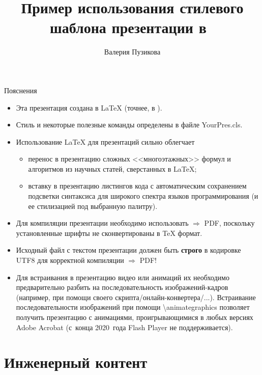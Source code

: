 \documentclass{YourPres}
\title{Пример использования стилевого шаблона презентации в~\XeLaTeX}
\author{Валерия Пузикова}
\begin{document}
  \Yourtitlepage

  \begin{frame}{Пояснения}
    \begin{itemize}
      \item[\YourCheckedbox] Эта презентация создана в \LaTeX{} (точнее, в \XeLaTeX{}).\\
      \item[\YourCheckedbox] Стиль и некоторые полезные команды определены в файле YourPres.cls.\\
      \item[\YourCrossedbox] Использование \LaTeX{} для презентаций сильно облегчает
         \begin{itemize}
            \item перенос в презентацию сложных <<многоэтажных>> формул и алгоритмов из научных статей, сверстанных в \LaTeX{}; \\
            \item вставку в презентацию листингов кода с автоматическим сохранением подсветки синтаксиса для широкого спектра языков программирования (и ее стилизацией под выбранную палитру).\\
         \end{itemize}
      \item[\YourHandRight] Для компиляции презентации необходимо использовать \XeLaTeX{} $\Rightarrow$ PDF, поскольку установленные шрифты не сконвертированы в \TeX{} формат.\\
      \item[\YourHandRight] Исходный файл с текстом презентации должен быть \textbf{строго} в кодировке UTF8 для корректной компиляции \XeLaTeX{} $\Rightarrow$ PDF!\\
      \item[\YourHandRight] Для встраивания в презентацию видео или анимаций их необходимо предварительно разбить на последовательность изображений-кадров (например, при помощи своего скрипта/онлайн-конвертера/...). Встраивание последовательности изображений при помощи {\Yourcode\textbackslash animategraphics} позволяет получить презентацию с анимациями, проигрывающимися в любых версиях Adobe Acrobat (с~конца 2020~года Flash Player не поддерживается).
    \end{itemize}
  \end{frame}


  \section{Инженерный контент}
\end{document}
